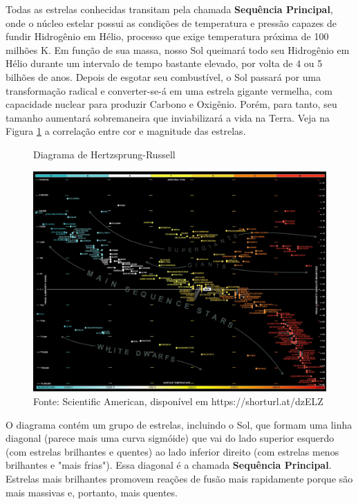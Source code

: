 \documentclass[a4paper,12pt,]{book}
\begin{document}
Todas as estrelas conhecidas transitam pela chamada \textbf{Sequência Principal}, onde o núcleo estelar possui as condições de temperatura e pressão capazes de fundir Hidrogênio em Hélio, processo que exige temperatura próxima de 100 milhões K. Em função de sua massa, nosso Sol queimará todo seu Hidrogênio em Hélio durante um intervalo de tempo bastante elevado, por volta de 4 ou 5 bilhões de anos. Depois de esgotar seu combustível, o Sol passará por uma transformação radical e converter-se-á em uma estrela gigante vermelha, com capacidade nuclear para produzir Carbono e Oxigênio. Porém, para tanto, seu tamanho aumentará sobremaneira que inviabilizará a vida na Terra. Veja na Figura \ref{fig:HR} \cite{HR} a correlação entre cor e magnitude das estrelas.

\begin{figure}[h]
	\centering
	\caption{Diagrama de Hertzsprung-Russell}
	\vspace{0.25cm}
	\label{fig:HR}
	\includegraphics[width=1\linewidth]{imagens/diagrama-hr-completo.jpg}
	\caption*{Fonte: Scientific American, disponível em https://shorturl.at/dzELZ}
\end{figure}

O diagrama contém um grupo de estrelas, incluindo o Sol, que formam uma linha diagonal (parece mais uma curva sigmóide) que vai do lado superior esquerdo (com estrelas brilhantes e quentes) ao lado inferior direito (com estrelas menos brilhantes e "mais frias"). Essa diagonal é a chamada \textbf{Sequência Principal}. Estrelas mais brilhantes promovem reações de fusão mais rapidamente porque são mais massivas e, portanto, mais quentes.
\end{document}
